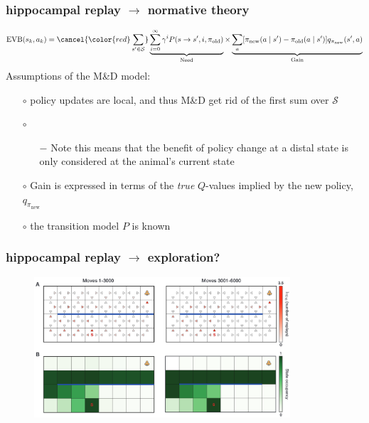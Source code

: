 \documentclass[aspectratio=169]{beamer}
\newcommand{\old}{\text{old}}
\newcommand{\new}{\text{new}}
\begin{document}
\begin{frame}
    \frametitle{hippocampal replay $\rightarrow$ normative theory}
    $$ \text{EVB}(s_k, a_k) = \cancel{\color{red} \sum_{s'\in \mathcal{S}}} \underbrace{\sum_{i=0}^{\infty} \gamma^i P(s \rightarrow s', i, \pi_{\old})}_{\text{Need}} \times \underbrace{\sum_a [\pi_{\new}(a\mid s') - \pi_\old (a\mid s')]q_{\pi_\new}(s',a)}_{\text{Gain}} $$
    Assumptions of the M\&D model:
    \begin{itemize}
        \item[$\circ$] policy updates are local, and thus M\&D get rid of the first sum over $\mathcal{S}$
        \item[$\circ$] \begin{itemize}
            \item[$-$] Note this means that the benefit of policy change at a distal state is only considered at the animal's current state
        \end{itemize}
        \item[$\circ$] Gain is expressed in terms of the \emph{true} $Q$-values implied by the new policy, $q_{\pi_\new}$
        \item[$\circ$] the transition model $P$ is known   
    \end{itemize}
\end{frame}

\begin{frame}
    \frametitle{hippocampal replay $\rightarrow$ exploration?}
    \begin{figure}
        \centering
        \includegraphics[width=0.85\textwidth]{md_explore.png}
    \end{figure}
\end{frame}
\end{document}
